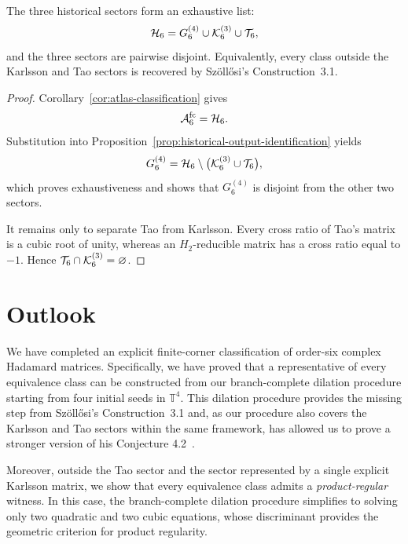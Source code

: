 \begin{corollary}
\label{cor:szollosi-conjecture}
The three historical sectors form an exhaustive list:
\begin{equation}
\mathcal H_6
=
G_6^{(4)}\cup\mathcal K_6^{(3)}\cup\mathcal T_6,
\label{eq:szollosi-conjecture-list}
\end{equation}
and the three sectors are pairwise disjoint. Equivalently, every
class outside the Karlsson and Tao sectors is recovered by
Sz\"oll\H{o}si's Construction~3.1.
\end{corollary}

\begin{proof}
Corollary~\ref{cor:atlas-classification} gives
\[
\mathcal A_6^{\mathrm{fc}}=\mathcal H_6.
\]
Substitution into
Proposition~\ref{prop:historical-output-identification} yields
\[
G_6^{(4)}
=
\mathcal H_6\setminus
\bigl(\mathcal K_6^{(3)}\cup\mathcal T_6\bigr),
\]
which proves exhaustiveness and shows that $G_6^{(4)}$ is disjoint
from the other two sectors.

It remains only to separate Tao from Karlsson. Every cross ratio of
Tao's matrix is a cubic root of unity, whereas an $H_2$-reducible
matrix has a cross ratio equal to $-1$. Hence
$\mathcal T_6\cap\mathcal K_6^{(3)}=\varnothing$.
\end{proof}

\section{Outlook}
\label{sec:outlook}
We have completed an explicit finite-corner classification of order-six complex Hadamard matrices. Specifically, we have proved that a representative of every equivalence class can be constructed from our branch-complete dilation procedure starting from four initial seeds in $\mathbb{T}^4$. This dilation procedure provides the missing step from Sz\"oll\H{o}si's Construction~3.1 and, as our procedure also covers the Karlsson and Tao sectors within the same framework, has allowed us to prove a stronger version of his Conjecture 4.2~\cite{Szollosi2012FourParameter}. 

Moreover, outside the Tao sector and the sector represented by a single explicit Karlsson matrix, we show that every equivalence class admits a \textit{product-regular} witness. In this case, the branch-complete dilation procedure simplifies to solving only two quadratic and two cubic equations, whose discriminant provides the geometric criterion for product regularity.

